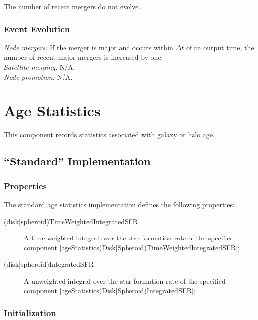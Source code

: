 The number of recent mergers do not evolve.

\subsubsection{Event Evolution}

\noindent\emph{Node mergers:} If the merger is major and occurs within $\Delta t$ of an output time, the number of recent major mergers is increased by one.\\

\noindent\emph{Satellite merging:} N/A.\\

\noindent\emph{Node promotion:} N/A.\\

\section{Age Statistics}

This \gls{component} records statistics associated with galaxy or halo age.

\subsection{``Standard'' Implementation}

\subsubsection{Properties}

The standard age statistics implementation defines the following properties:
\begin{description}
 \item [{\normalfont \ttfamily (disk|spheroid)TimeWeightedIntegratedSFR}] A time-weighted integral over the star formation rate of the specified component [{\normalfont \ttfamily ageStatistics(Disk|Spheroid)TimeWeightedIntegratedSFR}];
 \item [{\normalfont \ttfamily (disk|spheroid)IntegratedSFR}] A unweighted integral over the star formation rate of the specified component [{\normalfont \ttfamily ageStatistics(Disk|Spheroid)IntegratedSFR}];
\end{description}

\subsubsection{Initialization}

